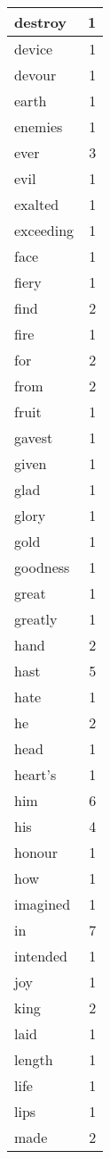 \begin{center}
\begin{longtable}{l|r}
destroy & 1 \\ \hline
device & 1 \\ \hline
devour & 1 \\ \hline
earth & 1 \\ \hline
enemies & 1 \\ \hline
ever & 3 \\ \hline
evil & 1 \\ \hline
exalted & 1 \\ \hline
exceeding & 1 \\ \hline
face & 1 \\ \hline
fiery & 1 \\ \hline
find & 2 \\ \hline
fire & 1 \\ \hline
for & 2 \\ \hline
from & 2 \\ \hline
fruit & 1 \\ \hline
gavest & 1 \\ \hline
given & 1 \\ \hline
glad & 1 \\ \hline
glory & 1 \\ \hline
gold & 1 \\ \hline
goodness & 1 \\ \hline
great & 1 \\ \hline
greatly & 1 \\ \hline
hand & 2 \\ \hline
hast & 5 \\ \hline
hate & 1 \\ \hline
he & 2 \\ \hline
head & 1 \\ \hline
heart's & 1 \\ \hline
him & 6 \\ \hline
his & 4 \\ \hline
honour & 1 \\ \hline
how & 1 \\ \hline
imagined & 1 \\ \hline
in & 7 \\ \hline
intended & 1 \\ \hline
joy & 1 \\ \hline
king & 2 \\ \hline
laid & 1 \\ \hline
length & 1 \\ \hline
life & 1 \\ \hline
lips & 1 \\ \hline
made & 2 \\ \hline

\end{longtable}
\end{center}
